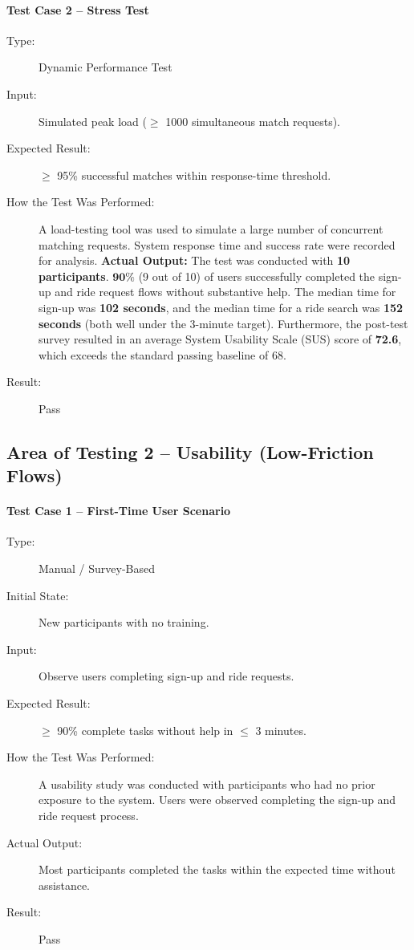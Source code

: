 \paragraph{Test Case 2 – Stress Test} \label{test-R1-2}
\begin{description}
    \item[Type:] Dynamic Performance Test
    \item[Input:] Simulated peak load ($\ge$ 1000 simultaneous match requests).
    \item[Expected Result:] $\ge$ 95\% successful matches within response-time threshold.
    \item[How the Test Was Performed:] A load-testing tool was used to simulate a large number of concurrent matching requests. System response time and success rate were recorded for analysis.
    \textbf{Actual Output:} The test was conducted with \textbf{10 participants}. $\textbf{90\%}$ (9 out of 10) of users successfully completed the sign-up and ride request flows without substantive help. The median time for sign-up was \textbf{102 seconds}, and the median time for a ride search was \textbf{152 seconds} (both well under the 3-minute target). Furthermore, the post-test survey resulted in an average System Usability Scale (SUS) score of \textbf{72.6}, which exceeds the standard passing baseline of 68.    \item[Result:] Pass
\end{description}


\subsection{Area of Testing 2 – Usability (Low-Friction Flows)}

\paragraph{Test Case 1 – First-Time User Scenario} \label{test-U1-1}
\begin{description}
    \item[Type:] Manual / Survey-Based
    \item[Initial State:] New participants with no training.
    \item[Input:] Observe users completing sign-up and ride requests.
    \item[Expected Result:] $\ge$ 90\% complete tasks without help in $\le$ 3 minutes.
    \item[How the Test Was Performed:] A usability study was conducted with participants who had no prior exposure to the system. Users were observed completing the sign-up and ride request process.
    \item[Actual Output:] Most participants completed the tasks within the expected time without assistance.
    \item[Result:] Pass
\end{description}

